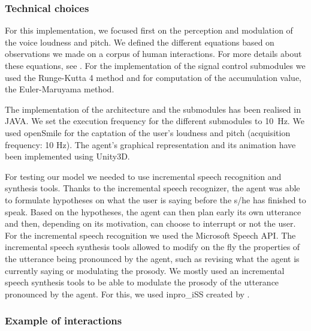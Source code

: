 \subsubsection{Technical choices}

For this implementation, we focused first on the perception and modulation of the voice loudness and pitch. We defined the different equations based on observations we made on a corpus of human interactions. For more details about these equations, see \cite{jegou_continuous_2015}. For the implementation of the signal control submodules we used the Runge-Kutta 4 method and for computation of the accumulation value, the Euler-Maruyama method. 

The implementation of the architecture and the submodules has been realised in JAVA. We set the execution frequency for the different submodules to 10~Hz. 
We used openSmile \citep{eyben_recent_2013} for the captation of the user's loudness and pitch (acquisition frequency: 10 Hz). %
The agent's graphical representation and its animation have been implemented using Unity3D. 

For testing our model we needed to use incremental speech recognition and synthesis tools. Thanks to the incremental speech recognizer, the agent was able to formulate hypotheses on what the user is saying before the s/he has finished to speak. Based on the hypotheses, the agent can then plan early its own utterance and then, depending on its motivation, can choose to interrupt or not the user. For the incremental speech recognition we used the Microsoft Speech API. 
The incremental speech synthesis tools allowed to modify on the fly the properties of the utterance being pronounced by the agent, such as revising what the agent is currently saying or modulating the prosody. We mostly used an incremental speech synthesis tools to be able to modulate the prosody of the utterance pronounced by the agent. For this, we used inpro\_iSS created by \cite{baumann_inpro_2012}. 

\subsubsection{Example of interactions}

